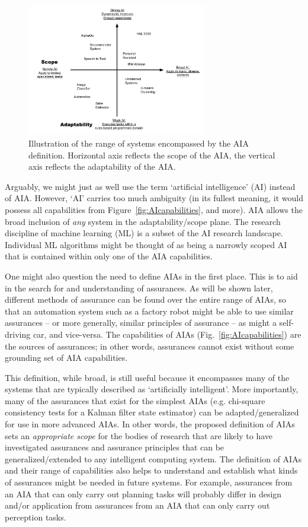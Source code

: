 	\begin{figure}[htbp]
    	\centering
     	\includegraphics[width=0.7\textwidth]{Figures/strong_weak_narrow_broad.pdf}
    	\caption{Illustration of the range of systems encompassed by the AIA definition. Horizontal axis reflects the scope of the AIA, the vertical axis reflects the adaptability of the AIA.}
        \label{fig:StrongWeak}
    \end{figure}

    Arguably, we might just as well use the term `artificial intelligence' (AI) instead of AIA. However, `AI' carries too much ambiguity (in its fullest meaning, it would possess all capabilities from Figure~\ref{fig:AIcapabilities}, and more). AIA allows the broad inclusion of \emph{any} system in the adaptability/scope plane. The research discipline of machine learning (ML) is a subset of the AI research landscape. Individual ML algorithms might be thought of as being a narrowly scoped AI that is contained within only one of the AIA capabilities. 

    One might also question the need to define AIAs in the first place. This is to aid in the search for and understanding of assurances. As will be shown later, different methods of assurance can be found over the entire range of AIAs, so that an automation system such as a factory robot might be able to use similar assurances -- or more generally, similar principles of assurance -- as might a self-driving car, and vice-versa. The capabilities of AIAs (Fig.~\ref{fig:AIcapabilities}) are the sources of assurances; in other words, assurances cannot exist without some grounding set of AIA capabilities. 

    This definition, while broad, is still useful because it encompasses many of the systems that are typically described as `artificially intelligent'. More importantly, many of the assurances that exist for the simplest AIAs (e.g. chi-square consistency tests for a Kalman filter state estimator) can be adapted/generalized for use in more advanced AIAs. In other words, the proposed definition of AIAs sets an \emph{appropriate scope} for the bodies of research that are likely to have investigated assurances and assurance principles that can be generalized/extended to any intelligent computing system. The definition of AIAs and their range of capabilities also helps to understand and establish what kinds of assurances might be needed in future systems. For example, assurances from an AIA that can only carry out planning tasks will probably differ in design and/or application from assurances from an AIA that can only carry out perception tasks. 
